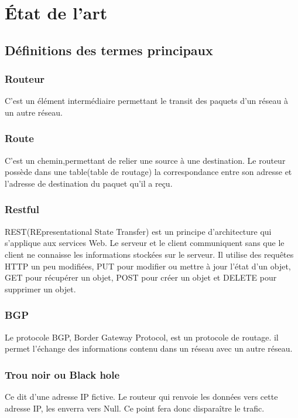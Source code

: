\chapter{État de l'art}

\section{Définitions des termes principaux}

\subsection{Routeur}
C'est un élément intermédiaire permettant le transit des paquets d'un réseau à un autre réseau.

\subsection{Route}
C'est un chemin,permettant de relier une source à une destination. Le routeur possède dans une table(table de routage) la correspondance entre son adresse et l'adresse de destination du paquet qu'il a reçu.

\subsection{Restful}
REST(REpresentational State Transfer) est un principe d'architecture qui s'applique aux services Web. Le serveur et le client communiquent sans que le client ne connaisse les informations stockées sur le serveur. Il utilise des requêtes HTTP un peu modifiées, PUT pour modifier ou mettre à jour l'état d'un objet, GET pour récupérer un objet, POST pour créer un objet et DELETE pour supprimer un objet.

\subsection{BGP}
Le protocole BGP, Border Gateway Protocol, est un protocole de routage. il permet l'échange des informations contenu dans un réseau avec un autre réseau.

\subsection{Trou noir ou Black hole}
Ce dit d'une adresse IP fictive. Le routeur qui renvoie les données vers cette adresse IP, les enverra vers Null. Ce point fera donc disparaître le trafic.

